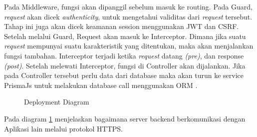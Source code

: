 Pada Middleware, fungsi akan dipanggil sebelum masuk ke routing. Pada Guard, \textit{request} akan dicek \textit{authenticity}, untuk mengetahui validitas dari \textit{request} tersebut. Tahap ini juga akan dicek keamanan session menggunakan JWT dan CSRF. Setelah melalui Guard, Request akan masuk ke Interceptor. Dimana jika suatu \textit{request} mempunyai suatu karakteristik yang ditentukan, maka akan menjalankan fungsi tambahan. Interceptor terjadi ketika \textit{request} datang \textit{(pre)}, dan response \textit{(post)}. Setelah melewati Interceptor, fungsi di Controller akan dijalankan. Jika pada Controller tersebut perlu data dari database maka akan turun ke service PrismaJs untuk melakukan database call menggunakan ORM \cite{NestJS}.

\begin{figure}[h]
	{\par}
	\caption{Deployment Diagram}
	\label{deployment}
\end{figure}
Pada diagram \ref{deployment} menjelaskan bagaimana server backend berkomunikasi dengan Aplikasi lain melalui protokol HTTPS. 

